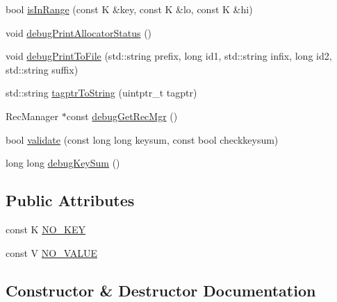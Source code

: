\begin{DoxyCompactItemize}
\item 
bool \hyperlink{classbst__ns_1_1bst_a581f0a73f0567c0b6527f97038715849}{is\+In\+Range} (const K \&key, const K \&lo, const K \&hi)
\item 
void \hyperlink{classbst__ns_1_1bst_a4b88ec8d5359baef55d780168792f988}{debug\+Print\+Allocator\+Status} ()
\item 
void \hyperlink{classbst__ns_1_1bst_a86b206075f5fa4c2f272a6fb1b547421}{debug\+Print\+To\+File} (std\+::string prefix, long id1, std\+::string infix, long id2, std\+::string suffix)
\item 
std\+::string \hyperlink{classbst__ns_1_1bst_a147971fbaa7c42d26442240f42f505ef}{tagptr\+To\+String} (uintptr\+\_\+t tagptr)
\item 
Rec\+Manager $\ast$const \hyperlink{classbst__ns_1_1bst_acb9992d1e5f6bdf91d6437ea08244614}{debug\+Get\+Rec\+Mgr} ()
\item 
bool \hyperlink{classbst__ns_1_1bst_a019ec02bfcc4eb12a6b1e9e06ea82fe6}{validate} (const long long keysum, const bool checkkeysum)
\item 
long long \hyperlink{classbst__ns_1_1bst_a1ef14de4c39bec643f720918c110f89a}{debug\+Key\+Sum} ()
\end{DoxyCompactItemize}
\subsection*{Public Attributes}
\begin{DoxyCompactItemize}
\item 
const K \hyperlink{classbst__ns_1_1bst_a29f9c4bcd6b3196ee4c7664caa4ddfc1}{N\+O\+\_\+\+K\+EY}
\item 
const V \hyperlink{classbst__ns_1_1bst_af1520d0c3d203a1b4e8d1967092662a5}{N\+O\+\_\+\+V\+A\+L\+UE}
\end{DoxyCompactItemize}


\subsection{Constructor \& Destructor Documentation}
\mbox{\label{classbst__ns_1_1bst_aa917b4d8a64085282bdb6a94282255b1}} 
